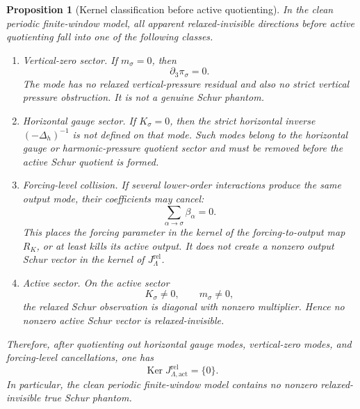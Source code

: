 \documentclass[11pt]{article}
\numberwithin{equation}{section}
\newtheorem{proposition}[theorem]{Proposition}
\DeclareMathOperator{\Ker}{Ker}
\begin{document}
\begin{proposition}[Kernel classification before active quotienting]\label{prop:kernel-classification-pre-active}
In the clean periodic finite-window model, all apparent relaxed-invisible directions before active quotienting fall into one of the following classes.
\begin{enumerate}[label=(\roman*)]
\item \emph{Vertical-zero sector.}  If \(m_\sigma=0\), then
\[
        \partial_3\pi_\sigma=0.
\]
The mode has no relaxed vertical-pressure residual and also no strict vertical pressure obstruction.  It is not a genuine Schur phantom.

\item \emph{Horizontal gauge sector.}  If \(K_\sigma=0\), then the strict horizontal inverse \(( -\Delta_h)^{-1}\) is not defined on that mode.  Such modes belong to the horizontal gauge or harmonic-pressure quotient sector and must be removed before the active Schur quotient is formed.

\item \emph{Forcing-level collision.}  If several lower-order interactions produce the same output mode, their coefficients may cancel:
\[
        \sum_{\alpha\to\sigma}\beta_\alpha=0.
\]
This places the forcing parameter in the kernel of the forcing-to-output map \(R_K\), or at least kills its active output.  It does not create a nonzero output Schur vector in the kernel of \(J_\Lambda^{\mathrm{rel}}\).

\item \emph{Active sector.}  On the active sector
\[
        K_\sigma\neq0,
        \qquad
        m_\sigma\neq0,
\]
the relaxed Schur observation is diagonal with nonzero multiplier.  Hence no nonzero active Schur vector is relaxed-invisible.
\end{enumerate}
Therefore, after quotienting out horizontal gauge modes, vertical-zero modes, and forcing-level cancellations, one has
\[
        \Ker J_{\Lambda,\mathrm{act}}^{\mathrm{rel}}
        =\{0\}.
\]
In particular, the clean periodic finite-window model contains no nonzero relaxed-invisible true Schur phantom.
\end{proposition}
\end{document}
